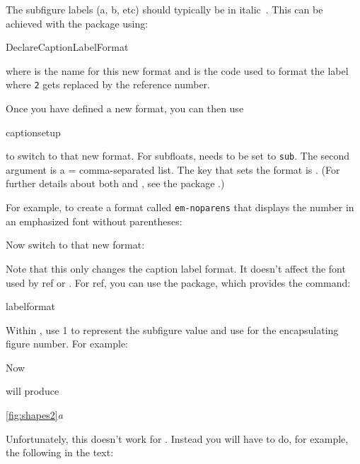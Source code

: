 
The subfigure labels (a, b, etc) should typically be in
italic~\cite{turabian96}. This can be achieved with the
 package using:
\begin{definition}
\gls{DeclareCaptionLabelFormat}
\end{definition}
where  is the name for this new format and
 is the code used to format the label
where \texttt{2} gets replaced by the reference number.

Once you have defined a new format, you can then use
\begin{definition}
\gls{captionsetup}
\end{definition}
to switch to that new format. For subfloats,  needs to be
set to \texttt{sub}. The second argument  is a
= comma-separated list. The key that sets the format is
. (For further details about
both  and , see
the  package .)

For example, to create a format called \texttt{em-noparens} that
displays the number in an emphasized font without parentheses:
\begin{codeS}
\end{codeS}
Now switch to that new format:
\begin{codeS}
\end{codeS}

Note that this only changes the caption label format. It doesn't affect the font 
used by \gls{ref} or .  For \gls{ref}, you can use the 
 package, which provides the command:
\begin{definition}
\gls{labelformat}
\end{definition}
Within , use 1 to represent the subfigure value
and use  for the encapsulating figure number. For
example:
\begin{codeS}
\end{codeS}
Now
\begin{codeS}
\end{codeS}
will produce
\begin{resultS}
\ref*{fig:shapes2}\emph{a}
\end{resultS}
Unfortunately, this doesn't work for . Instead you will have 
to do, for example, the following in the text:
\begin{codeS}
\end{codeS}

